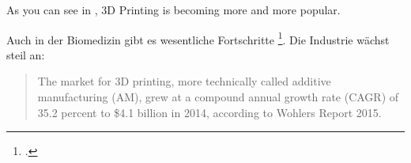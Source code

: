 \documentclass[11pt,a4paper]{article}
\begin{document}
As you can see in \cite{SPACECeramics},
3D Printing is becoming more and more popular.

Auch in der Biomedizin gibt es wesentliche Fortschritte \footcite[siehe][]{BABY,BIOMED}.
Die Industrie wächst steil an: \begin{quotation}
The market for 3D printing, more technically called additive manufacturing (AM), grew at a compound annual growth rate (CAGR) of 35.2 percent to  \$4.1 billion in 2014, according to Wohlers Report 2015. \emph{\cite{FORBES}}
\end{quotation}

\newpage

\printbibliography
\end{document}

